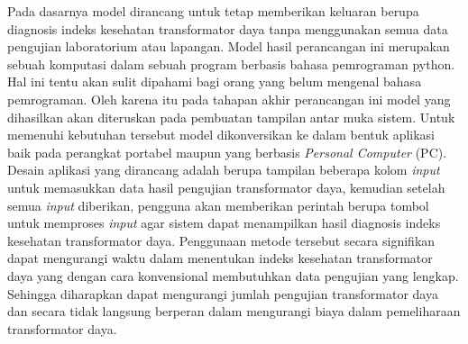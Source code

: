 Pada dasarnya model dirancang untuk tetap memberikan keluaran berupa diagnosis indeks kesehatan transformator daya tanpa menggunakan semua data pengujian laboratorium atau lapangan. Model hasil perancangan ini merupakan sebuah komputasi dalam sebuah program berbasis bahasa pemrograman python. Hal ini tentu akan sulit dipahami bagi orang yang belum mengenal bahasa pemrograman. Oleh karena itu pada tahapan akhir perancangan ini model yang dihasilkan akan diteruskan pada pembuatan tampilan antar muka sistem. Untuk memenuhi kebutuhan tersebut model dikonversikan ke dalam bentuk aplikasi baik pada perangkat portabel maupun yang berbasis \textit{Personal Computer} (PC). Desain aplikasi yang dirancang adalah berupa tampilan beberapa kolom \textit{input} untuk memasukkan data hasil pengujian transformator daya, kemudian setelah semua \textit{input} diberikan, pengguna akan memberikan perintah berupa tombol untuk memproses \textit{input} agar sistem dapat menampilkan hasil diagnosis indeks kesehatan transformator daya. Penggunaan metode tersebut secara signifikan dapat mengurangi waktu dalam menentukan indeks kesehatan transformator daya yang dengan cara konvensional membutuhkan data pengujian yang lengkap. Sehingga diharapkan dapat mengurangi jumlah pengujian transformator daya dan secara tidak langsung berperan dalam mengurangi biaya dalam pemeliharaan transformator daya. 






%
%








